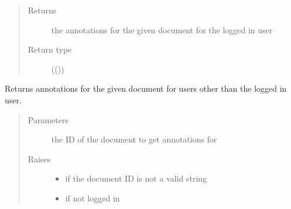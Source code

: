 \documentclass[letterpaper,10pt,english]{sphinxmanual}
\begin{document}
\begin{fulllineitems}
\begin{fulllineitems}
\begin{quote}
\begin{description}
\begin{itemize}
\end{itemize}

\item[{Returns}] \leavevmode
\sphinxAtStartPar
the annotations for the given document for the logged in user

\item[{Return type}] \leavevmode
\sphinxAtStartPar
{}(())

\end{description}\end{quote}

\end{fulllineitems}


\begin{fulllineitems}
\label{\detokenize{autoapi/pine/client/index:pine.client.PineClient.get_others_document_annotations}}
\sphinxAtStartPar
Returns annotations for the given document for users other than the logged in user.
\begin{quote}\begin{description}
\item[{Parameters}] \leavevmode
\sphinxAtStartPar
{} \textendash{} the ID of the document to get annotations for

\item[{Raises}] \leavevmode\begin{itemize}
\item {} 
\sphinxAtStartPar
{\hyperref[\detokenize{autoapi/pine/client/exceptions/index:pine.client.exceptions.PineClientValueException}]{}} \textendash{} if the document ID is not a valid string

\item {} 
\sphinxAtStartPar
{\hyperref[\detokenize{autoapi/pine/client/exceptions/index:pine.client.exceptions.PineClientAuthException}]{}} \textendash{} if not logged in


\end{itemize}
\end{description}
\end{quote}
\end{fulllineitems}
\end{fulllineitems}
\end{document}

